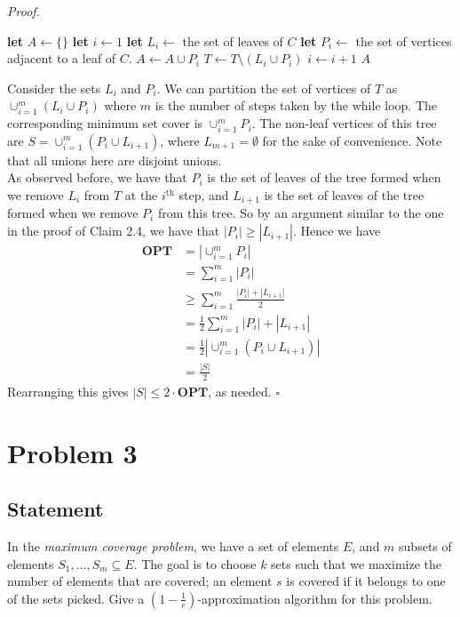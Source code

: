 \documentclass[a4paper]{article}
\newenvironment{proof}{\begin{breakbox}\textit{Proof.}}{\hfill$\square$\end{breakbox}}
\newcommand{\nl}{\vspace{0.2cm}\\}
\newcommand{\OPT}{\mathbf{OPT}}
\begin{document}
\begin{proof}
\begin{algorithmic}[1]
            \State \textbf{let} $A \gets \{\}$
            \State \textbf{let} $i \gets 1$
                \State \textbf{let} $L_i \gets$ the set of leaves of $C$
                \State \textbf{let} $P_i \gets$ the set of vertices adjacent to a leaf of $C$.
                \State $A \gets A \cup P_i$
                \State $T \gets T \setminus (L_i \cup P_i)$
                \State $i \gets i + 1$
            \EndWhile
            \State \Return $A$
        \EndFunction
    \end{algorithmic}
    Consider the sets $L_i$ and $P_i$. We can partition the set of vertices of $T$ as $\cup_{i=1}^m (L_i \cup P_i)$ where $m$ is the number of steps taken by the while loop.
    The corresponding minimum set cover is $\cup_{i=1}^m P_i$.
    The non-leaf vertices of this tree are $S = \cup_{i=1}^m (P_i \cup L_{i+1})$, where $L_{m+1} = \emptyset$ for the sake of convenience. Note that all unions here are disjoint unions.\nl
    As observed before, we have that $P_i$ is the set of leaves of the tree formed when we remove $L_i$ from $T$ at the $i^\mathrm{th}$ step, and $L_{i+1}$ is the set of leaves of the tree
    formed when we remove $P_i$ from this tree. So by an argument similar to the one in the proof of Claim 2.4, we
    have that $|P_i| \ge |L_{i+1}|$. Hence we have
    \begin{align*}
        \OPT &= |\cup_{i=1}^m P_i|\\
             &= \sum_{i=1}^m |P_i|\\
             &\ge \sum_{i=1}^m \frac{|P_i| + |L_{i+1}|}{2}\\
             &= \frac{1}{2} \sum_{i=1}^m |P_i| + |L_{i+1}|\\
             &= \frac{1}{2} |\cup_{i=1}^m (P_i \cup L_{i+1})|\\
             &= \frac{|S|}{2}
    \end{align*}
    Rearranging this gives $|S| \le 2 \cdot \OPT$, as needed.
\end{proof}

\newpage

\section{Problem 3}
\subsection{Statement}
In the \emph{maximum coverage problem}, we have a set of elements $E$, and $m$ subsets of elements $S_1, \ldots, S_m \subseteq E$. The goal is to choose $k$ sets such that we maximize the number of
elements that are covered; an element $s$ is covered if it belongs to one of the sets picked. Give a $\left(1-\frac{1}{e}\right)$-approximation algorithm for this problem.
\end{document}
